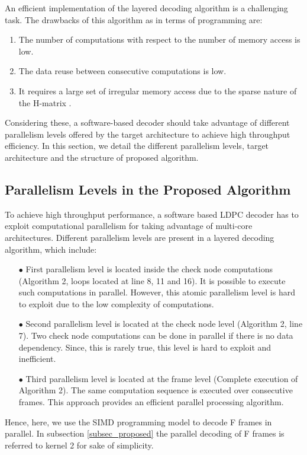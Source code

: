 \documentclass{article}
\begin{document}
An efficient implementation of the layered decoding algorithm is a challenging task. The drawbacks of this algorithm as in terms of programming are:
\begin{enumerate}
\item The number of computations with respect to the number of memory access is low.
\item The data reuse between consecutive computations is low.
\item It requires a large set of irregular memory access due to the sparse nature of the H-matrix \cite{art_ldpc_cpu1}.
\end{enumerate}
Considering these, a software-based decoder should take advantage of different parallelism levels offered by the target architecture to achieve high throughput efficiency. In this section, we detail the different parallelism levels, target architecture and the structure of proposed algorithm.

\subsection{Parallelism Levels in the Proposed Algorithm}
To achieve high throughput performance, a software based LDPC decoder has to exploit computational parallelism for taking advantage of multi-core architectures. Different parallelism levels are present in a layered decoding algorithm, which include:
\begin{itemize}
  \item[$\bullet$ ] First parallelism level is located inside the check node computations (Algorithm 2, loops located at line 8, 11 and 16). It is possible to execute such computations in parallel. However, this atomic parallelism level is hard to exploit due to the low complexity of computations.
\item[$\bullet$ ] Second parallelism level is located at the check node level (Algorithm 2, line 7). Two check node computations can be done in parallel if there is no data dependency. Since, this is rarely true, this level is hard to exploit and inefficient.
\item[$\bullet$ ] Third parallelism level is located at the frame level (Complete execution of Algorithm 2). The same computation sequence is executed over consecutive frames. This approach provides an efficient parallel processing algorithm. 
\end{itemize}
Hence, here, we use the SIMD programming model to decode F frames in parallel. In subsection \ref{subsec_proposed} the parallel decoding of F frames is referred to kernel 2 for sake of simplicity.
\end{document}
